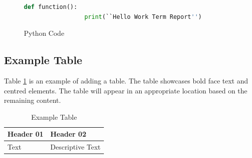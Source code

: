 \begin{figure}[!ht]
  \begin{lstlisting}[language=Python]
                def function():
                 print(``Hello Work Term Report'')
            \end{lstlisting}
  \caption{Python Code}
  \label{fig:figure02}
\end{figure}

\subsection{Example Table}
Table \ref{table:table01} is an example of adding a table. The table showcases bold face text and centred elements. The table will appear in an appropriate location based on the remaining content.

\begin{table}[ht]
  \begin{center}
    \begin{tabular}{|l|l|}
      \hline
      \textbf{Header 01} & \textbf{Header 02} \\ \hline
      Text               & Descriptive Text   \\ \hline
    \end{tabular}
    \caption{Example Table}
    \label{table:table01}
  \end{center}
\end{table}
